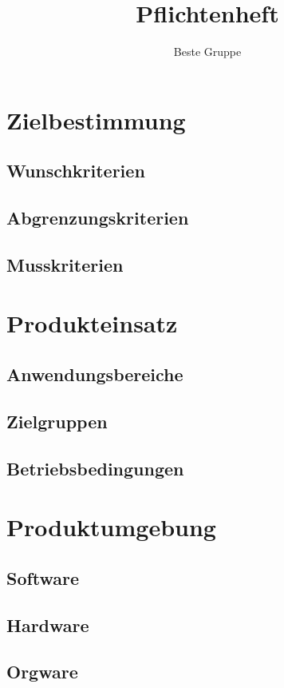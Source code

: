 \documentclass[a4paper]{scrreprt}
\begin{document}
 
\title{Pflichtenheft}
\author{Beste Gruppe}
\maketitle
 

\tableofcontents
 
\chapter{Zielbestimmung}

\section{Wunschkriterien}
\section{Abgrenzungskriterien}
\section{Musskriterien}

\chapter{Produkteinsatz}

\section{Anwendungsbereiche}
\section{Zielgruppen}
\section{Betriebsbedingungen}

\chapter{Produktumgebung}

\section{Software}
\section{Hardware}
\section{Orgware}
\end{document}
